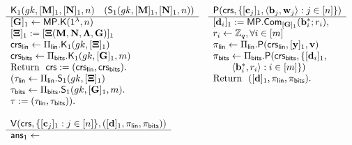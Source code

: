  
   
\begin{figure}
\begin{\algSize}
$$
\begin{array}{ll}
\begin{array}{l}
\algK_1(\gk,[\matr{M}]_1,[\matr{N}]_1,n)
\quad (\mathsf{S}_1(\gk,[\matr{M}]_1,[\matr{N}]_1,n))
\\
\hline
[\matr{G}]_1 \gets \MP.\algK(1^\lambda,n)\\
{[\matr{\Xi}]_1 := [\matr{\Xi}(\matr{M},\matr{N},\matr{\Lambda},\matr{G})]_1}\\
\crs_\sflin\gets\Pi_\sflin.\algK_1(\gk,[\matr{\Xi}]_1)\\
\crs_\sfbits\gets\Pi_\sfbits.\algK_1(\gk,[\matr{G}]_1,\lb)\\
\text{Return } \ \crs:=(\crs_\sflin,\crs_\sfbits).\\
(\tau_\sflin\gets\Pi_\sflin.\algS_1(\gk,[\matr{\Xi}]_1)\\
\tau_\sfbits\gets\Pi_\sfbits.\algS_1(\gk,[\matr{G}]_1,\lb).\\
\tau := (\tau_\sflin,\tau_\sfbits)).\\
\\
\end{array}
&
\begin{array}{l}
{\algP(\mathsf{crs}, \{[\vecb{c}_j]_1,\langle \vecb{b}_j,\vecb{w}_j\rangle:j\in[n]\})}\\
\hline
{[\vecb{d}_i]_1} := \MP.\Com_{[\matr{G}]_1}(\vecb{b}_i^*;r_i),\\
r_i \gets\Z_q, \forall i\in[\lb]\\
\pi_\sflin \gets 
    \Pi_\sflin.\algP
    (
        \crs_\sflin,
            [\vecb{y}]_1,
            \vecb{v}
    )\\
\pi_\sfbits \gets
    \Pi_\sfbits.\algP
    (
        \crs_\sfbits,
        \{[\matr{d}_i]_1,\\
\qquad
        \langle\matr{b}^*_i,r_i\rangle:i \in[\lb]\}
    )\\
\text{Return } \  ([\vecb{d}]_1,\pi_\sflin,\pi_\sfbits). \\
\\
\\
\\
\end{array}\\
\begin{array}{l}
{\algV(\mathsf{crs},\{[\vecb{c}_j]_1:j\in[n]\},([\vecb{d}]_1,\pi_\sflin,\pi_\sfbits))}\\
\hline
\mathsf{ans}_1 \gets

\end{array}
\end{array}$$
\end{\algSize}
\end{figure}
